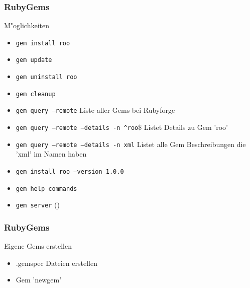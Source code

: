 \documentclass{beamer}
\begin{document}
\begin{frame}
  \frametitle{RubyGems}
  M"oglichkeiten
  \begin{itemize}
    \item \texttt{gem install roo}
    \item \texttt{gem update}
    \item \texttt{gem uninstall roo}
    \item \texttt{gem cleanup}
    \item \texttt{gem query --remote} Liste aller Gems bei Rubyforge
    \item \texttt{gem query --remote --details -n \^{}roo}\$ Listet Details zu Gem 'roo' 
    \item \texttt{gem query --remote --details -n xml} Listet alle Gem Beschreibungen die 'xml' im Namen haben
    \item \texttt{gem install roo --version 1.0.0}
    \item \texttt{gem help commands}
    \item \texttt{gem server} ()
  \end{itemize}
\end{frame}

\begin{frame}
  \frametitle{RubyGems}
  Eigene Gems erstellen
  \begin{itemize}
    \item .gemspec Dateien erstellen
    \item Gem 'newgem'
  \end{itemize}
\end{frame}

\end{document}
